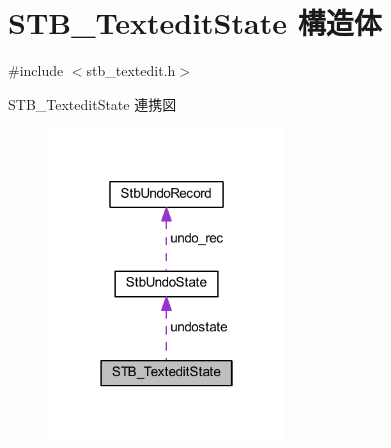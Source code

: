 \hypertarget{struct_s_t_b___textedit_state}{}\section{S\+T\+B\+\_\+\+Textedit\+State 構造体}
\label{struct_s_t_b___textedit_state}


{\ttfamily \#include $<$stb\+\_\+textedit.\+h$>$}



S\+T\+B\+\_\+\+Textedit\+State 連携図\nopagebreak
\begin{figure}[H]
\begin{center}
\leavevmode
\includegraphics[width=178pt]{struct_s_t_b___textedit_state__coll__graph}
\end{center}
\end{figure}
